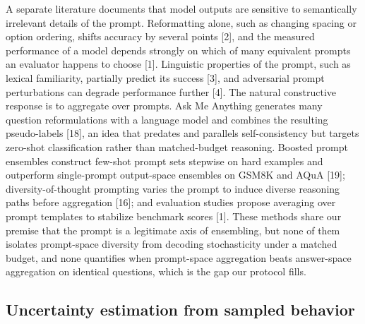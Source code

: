 \documentclass[preprint,12pt]{elsarticle}
\begin{document}
A separate literature documents that model outputs are sensitive to semantically irrelevant details of the prompt. Reformatting alone, such as changing spacing or option ordering, shifts accuracy by several points [2], and the measured performance of a model depends strongly on which of many equivalent prompts an evaluator happens to choose [1]. Linguistic properties of the prompt, such as lexical familiarity, partially predict its success [3], and adversarial prompt perturbations can degrade performance further [4]. The natural constructive response is to aggregate over prompts. Ask Me Anything generates many question reformulations with a language model and combines the resulting pseudo-labels [18], an idea that predates and parallels self-consistency but targets zero-shot classification rather than matched-budget reasoning. Boosted prompt ensembles construct few-shot prompt sets stepwise on hard examples and outperform single-prompt output-space ensembles on GSM8K and AQuA [19]; diversity-of-thought prompting varies the prompt to induce diverse reasoning paths before aggregation [16]; and evaluation studies propose averaging over prompt templates to stabilize benchmark scores [1]. These methods share our premise that the prompt is a legitimate axis of ensembling, but none of them isolates prompt-space diversity from decoding stochasticity under a matched budget, and none quantifies when prompt-space aggregation beats answer-space aggregation on identical questions, which is the gap our protocol fills.

\subsection{Uncertainty estimation from sampled behavior}
\end{document}

